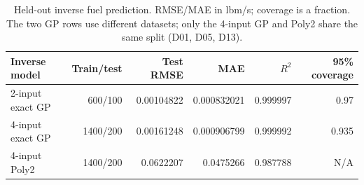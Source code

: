 \begin{table}[htbp]\centering\small\setlength{\tabcolsep}{4pt}\begin{tabular}{@{}lrrrrr@{}}\toprule
Inverse model & Train/test & Test RMSE & MAE & $R^2$ & 95\% coverage\\\midrule
2-input exact GP & 600/100 & 0.00104822 & 0.000832021 & 0.999997 & 0.97\\
4-input exact GP & 1400/200 & 0.00161248 & 0.000906799 & 0.999992 & 0.935\\
4-input Poly2 & 1400/200 & 0.0622207 & 0.0475266 & 0.987788 & N/A\\
\bottomrule\end{tabular}\caption{Held-out inverse fuel prediction. RMSE/MAE in lbm/s; coverage is a fraction. The two GP rows use different datasets; only the 4-input GP and Poly2 share the same split (D01, D05, D13).}\label{tab:fits}\end{table}